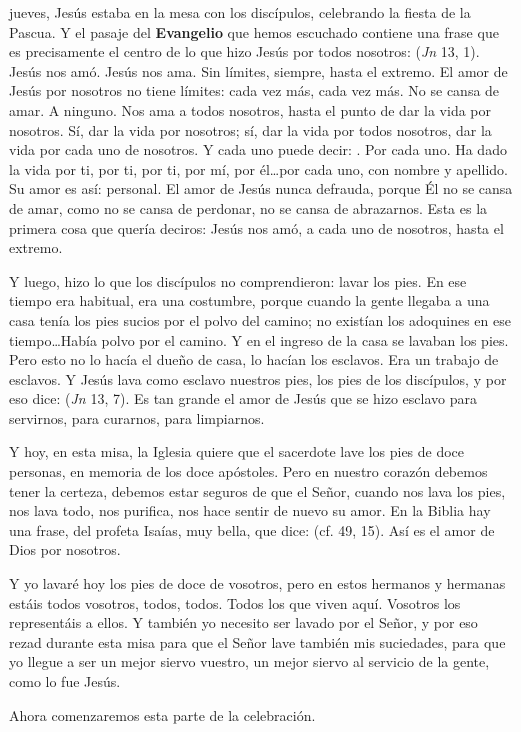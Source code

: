 \begin{body}
 jueves, Jesús estaba en la mesa con los discípulos, celebrando la fiesta de la Pascua. Y el pasaje del \textbf{Evangelio} que hemos escuchado contiene una frase que es precisamente el centro de lo que hizo Jesús por todos nosotros:  (\textit{Jn} 13, 1). Jesús nos amó. Jesús nos ama. Sin límites, siempre, hasta el extremo. El amor de Jesús por nosotros no tiene límites: cada vez más, cada vez más. No se cansa de amar. A ninguno. Nos ama a todos nosotros, hasta el punto de dar la vida por nosotros. Sí, dar la vida por nosotros; sí, dar la vida por todos nosotros, dar la vida por cada uno de nosotros. Y cada uno puede decir: . Por cada uno. Ha dado la vida por ti, por ti, por ti, por mí, por él\ldots por cada uno, con nombre y apellido. Su amor es así: personal. El amor de Jesús nunca defrauda, porque Él no se cansa de amar, como no se cansa de perdonar, no se cansa de abrazarnos. Esta es la primera cosa que quería deciros: Jesús nos amó, a cada uno de nosotros, hasta el extremo.

Y luego, hizo lo que los discípulos no comprendieron: lavar los pies. En ese tiempo era habitual, era una costumbre, porque cuando la gente llegaba a una casa tenía los pies sucios por el polvo del camino; no existían los adoquines en ese tiempo\ldots Había polvo por el camino. Y en el ingreso de la casa se lavaban los pies. Pero esto no lo hacía el dueño de casa, lo hacían los esclavos. Era un trabajo de esclavos. Y Jesús lava como esclavo nuestros pies, los pies de los discípulos, y por eso dice:  (\textit{Jn} 13, 7). Es tan grande el amor de Jesús que se hizo esclavo para servirnos, para curarnos, para limpiarnos.

Y hoy, en esta misa, la Iglesia quiere que el sacerdote lave los pies de doce personas, en memoria de los doce apóstoles. Pero en nuestro corazón debemos tener la certeza, debemos estar seguros de que el Señor, cuando nos lava los pies, nos lava todo, nos purifica, nos hace sentir de nuevo su amor. En la Biblia hay una frase, del profeta Isaías, muy bella, que dice:  (cf. 49, 15). Así es el amor de Dios por nosotros.

Y yo lavaré hoy los pies de doce de vosotros, pero en estos hermanos y hermanas estáis todos vosotros, todos, todos. Todos los que viven aquí. Vosotros los representáis a ellos. Y también yo necesito ser lavado por el Señor, y por eso rezad durante esta misa para que el Señor lave también mis suciedades, para que yo llegue a ser un mejor siervo vuestro, un mejor siervo al servicio de la gente, como lo fue Jesús.

Ahora comenzaremos esta parte de la celebración.
\end{body}

